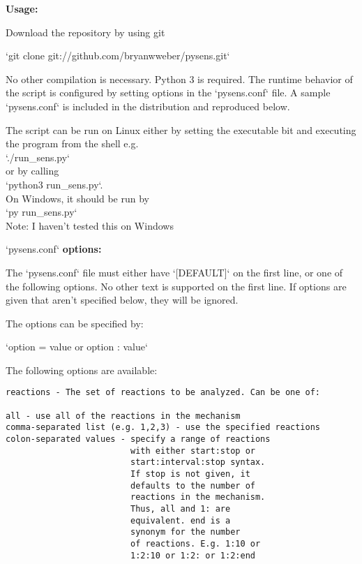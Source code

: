 
\begin{singlespace}
{\setlength{\parindent}{0pt}
\DefineShortVerb[commandchars=\\\{\}]{\`}
{\large \textbf{Usage:}}

Download the repository by using git

`git clone git://github.com/bryanwweber/pysens.git`

No other compilation is necessary. Python 3 is required.
The runtime behavior of the script is configured by setting options in
the `pysens.conf` file. A sample `pysens.conf` is included in the
distribution and reproduced below.

The script can be run on Linux either by setting the executable bit
and executing the program from the shell e.g.\\
`./run_sens.py`\\
or by calling\\
`python3 run_sens.py`.\\
On Windows, it should be run by\\
`py run_sens.py`\\
Note: I haven't tested this on Windows

\blankline

{\large `pysens.conf` \textbf{options:}}

The `pysens.conf` file must either have `[DEFAULT]` on the first line,
or one of the following options. No other text is supported on the first
line. If options are given that aren't specified below, they will be
ignored.

The options can be specified by:

`option = value or option : value`

The following options are available:

\begin{Verbatim}
reactions - The set of reactions to be analyzed. Can be one of:

all - use all of the reactions in the mechanism
comma-separated list (e.g. 1,2,3) - use the specified reactions
colon-separated values - specify a range of reactions
                         with either start:stop or
                         start:interval:stop syntax.
                         If stop is not given, it
                         defaults to the number of
                         reactions in the mechanism.
                         Thus, all and 1: are
                         equivalent. end is a
                         synonym for the number
                         of reactions. E.g. 1:10 or
                         1:2:10 or 1:2: or 1:2:end


\end{Verbatim}}
\end{singlespace}

